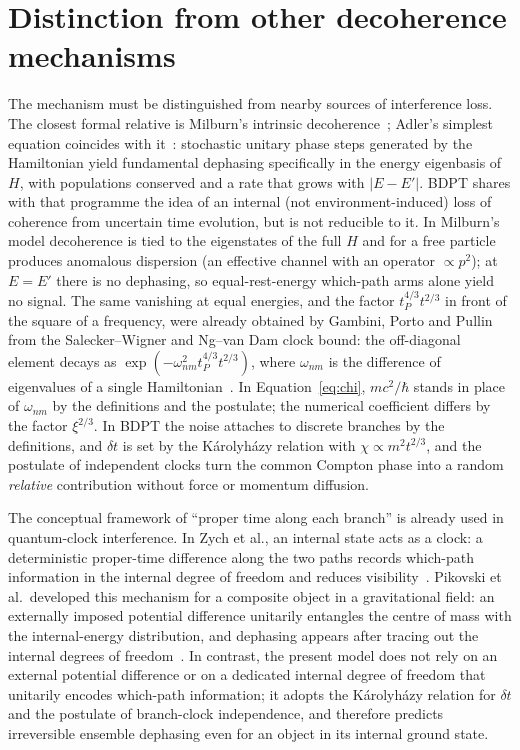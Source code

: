 \documentclass[11pt,a4paper]{article}
\begin{document}
\section{Distinction from other decoherence mechanisms}\label{sec:other_mechanisms}
The mechanism must be distinguished from nearby sources of interference loss. The closest formal relative is Milburn's intrinsic decoherence~\cite{milburn1991}; Adler's simplest equation coincides with it~\cite{adler2004,diosi2005}: stochastic unitary phase steps generated by the Hamiltonian yield fundamental dephasing specifically in the energy eigenbasis of $H$, with populations conserved and a rate that grows with $|E-E'|$. BDPT shares with that programme the idea of an internal (not environment-induced) loss of coherence from uncertain time evolution, but is not reducible to it. In Milburn's model decoherence is tied to the eigenstates of the full $H$ and for a free particle produces anomalous dispersion (an effective channel with an operator $\propto p^2$); at $E=E'$ there is no dephasing, so equal-rest-energy which-path arms alone yield no signal. The same vanishing at equal energies, and the factor \(t_P^{4/3}t^{2/3}\) in front of the square of a frequency, were already obtained by Gambini, Porto and Pullin from the Salecker--Wigner and Ng--van Dam clock bound: the off-diagonal element decays as \(\exp(-\omega_{nm}^2 t_P^{4/3}t^{2/3})\), where \(\omega_{nm}\) is the difference of eigenvalues of a single Hamiltonian~\cite{gambini2004,gambini2007}. In Equation~\eqref{eq:chi}, \(mc^2/\hbar\) stands in place of \(\omega_{nm}\) by the definitions and the postulate; the numerical coefficient differs by the factor \(\xi^{2/3}\). In BDPT the noise attaches to discrete branches by the definitions, and $\delta t$ is set by the K\'arolyh\'azy relation with $\chi\propto m^2 t^{2/3}$, and the postulate of independent clocks turn the common Compton phase into a random \emph{relative} contribution without force or momentum diffusion. 

The conceptual framework of ``proper time along each branch'' is already used in quantum-clock interference. In Zych et al., an internal state acts as a clock: a deterministic proper-time difference along the two paths records which-path information in the internal degree of freedom and reduces visibility~\cite{zych2011proper}. Pikovski et al.\ developed this mechanism for a composite object in a gravitational field: an externally imposed potential difference unitarily entangles the centre of mass with the internal-energy distribution, and dephasing appears after tracing out the internal degrees of freedom~\cite{pikovski2015}. In contrast, the present model does not rely on an external potential difference or on a dedicated internal degree of freedom that unitarily encodes which-path information; it adopts the K\'arolyh\'azy relation for $\delta t$ and the postulate of branch-clock independence, and therefore predicts irreversible ensemble dephasing even for an object in its internal ground state.
\end{document}

